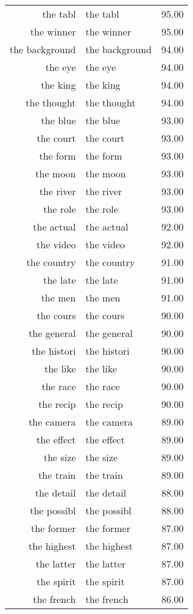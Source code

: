 \begin{table}[ht]
\begin{tabular}{rlr}
  the tabl & the tabl & 95.00 \\ 
  the winner & the winner & 95.00 \\ 
  the background & the background & 94.00 \\ 
  the eye & the eye & 94.00 \\ 
  the king & the king & 94.00 \\ 
  the thought & the thought & 94.00 \\ 
  the blue & the blue & 93.00 \\ 
  the court & the court & 93.00 \\ 
  the form & the form & 93.00 \\ 
  the moon & the moon & 93.00 \\ 
  the river & the river & 93.00 \\ 
  the role & the role & 93.00 \\ 
  the actual & the actual & 92.00 \\ 
  the video & the video & 92.00 \\ 
  the country & the country & 91.00 \\ 
  the late & the late & 91.00 \\ 
  the men & the men & 91.00 \\ 
  the cours & the cours & 90.00 \\ 
  the general & the general & 90.00 \\ 
  the histori & the histori & 90.00 \\ 
  the like & the like & 90.00 \\ 
  the race & the race & 90.00 \\ 
  the recip & the recip & 90.00 \\ 
  the camera & the camera & 89.00 \\ 
  the effect & the effect & 89.00 \\ 
  the size & the size & 89.00 \\ 
  the train & the train & 89.00 \\ 
  the detail & the detail & 88.00 \\ 
  the possibl & the possibl & 88.00 \\ 
  the former & the former & 87.00 \\ 
  the highest & the highest & 87.00 \\ 
  the latter & the latter & 87.00 \\ 
  the spirit & the spirit & 87.00 \\ 
  the french & the french & 86.00 \\ 

\end{tabular}
\end{table}
